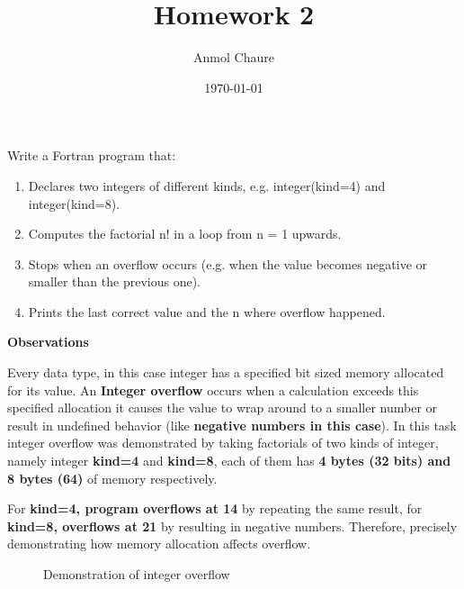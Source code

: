 \documentclass{homework}
\author{Anmol Chaure}
\date{\today}
\title{Homework 2}
\begin{document}
 \maketitle

\question
Write a Fortran program that:
\begin{enumerate}
    \item Declares two integers of different kinds, e.g. integer(kind=4) and integer(kind=8).
    \item Computes the factorial n! in a loop from n = 1 upwards.
    \item Stops when an overflow occurs (e.g. when the value becomes negative or smaller than the previous one).
    \item Prints the last correct value and the n where overflow happened.
\end{enumerate}


\hfill\break

\begin{sol}


{\large \textbf{Observations}}

Every data type, in this case integer has a specified bit sized memory allocated for its value. An \textbf{Integer overflow} occurs when a calculation exceeds this specified allocation it causes the value to wrap around to a smaller number or result in undefined behavior (like \textbf{negative numbers in this case}). In this task integer overflow was demonstrated by taking factorials of two kinds of integer, namely integer \textbf{kind=4} and \textbf{kind=8}, each of them has \textbf{4 bytes (32 bits) and 8 bytes (64)} of memory respectively. 

For \textbf{kind=4, program overflows at 14} by repeating the same result, for \textbf{kind=8, overflows at 21} by resulting in negative numbers. Therefore, precisely demonstrating how memory allocation affects overflow. 






\hfill



\begin{figure}[h!]
    \noindent
    \begin{minipage}[t]{0.48\textwidth}
    \end{minipage}
    \hfill
    \begin{minipage}[t]{0.48\textwidth}
    \end{minipage}
    \caption{Demonstration of integer overflow}
    \label{fig:comparision of two kinds of integers}
\end{figure}




\end{sol}
\end{document}
